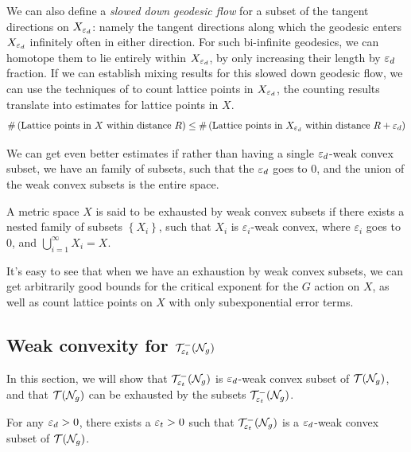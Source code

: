 \documentclass[12pt, reqno]{amsart}
\begin{document}
We can also define a \emph{slowed down geodesic flow} for a subset of the tangent directions on $X_{\varepsilon_d}$: namely the tangent directions along which the geodesic enters $X_{\varepsilon_d}$ infinitely often in either direction.
For such bi-infinite geodesics, we can homotope them to lie entirely within $X_{\varepsilon_d}$, by only increasing their length by $\varepsilon_d$ fraction.
If we can establish mixing results for this slowed down geodesic flow, we can use the techniques of \textcite{roblin2003ergodicite} to count lattice points in $X_{\varepsilon_d}$, the counting results translate into estimates for lattice points in $X$.
\begin{align*}
  \#\left( \text{Lattice points in $X$ within distance $R$} \right) \leq \#\left( \text{Lattice points in $X_{\varepsilon_d}$ within distance $R + \varepsilon_d$} \right)
\end{align*}

We can get even better estimates if rather than having a single $\varepsilon_d$-weak convex subset, we have an family of subsets, such that the $\varepsilon_d$ goes to $0$, and the union of the weak convex subsets is the entire space.

\begin{definition}
  A metric space $X$ is said to be exhausted by weak convex subsets if there exists a nested family of subsets $\left\{ X_i \right\}$, such that $X_i$ is $\varepsilon_i$-weak convex, where $\varepsilon_i$ goes to $0$, and $\bigcup_{i=1}^{\infty} X_i = X$.
\end{definition}

It's easy to see that when we have an exhaustion by weak convex subsets, we can get arbitrarily good bounds for the critical exponent for the $G$ action on $X$, as well as count lattice points on $X$ with only subexponential error terms.

\subsection{Weak convexity for $\mathcal{T}_{\varepsilon_t}^{-}(\mathcal{N}_g)$}
\label{sec:weak-conv-syst}

In this section, we will show that $\mathcal{T}_{\varepsilon_t}^{-}(\mathcal{N}_g)$ is $\varepsilon_d$-weak convex subset of $\mathcal{T}(\mathcal{N}_g)$, and that $\mathcal{T}(\mathcal{N}_g)$ can be exhausted by the subsets $\mathcal{T}_{\varepsilon_t}^{-}(\mathcal{N}_g)$.

\begin{theorem}
  \label{thm:weak-convexity}
  For any $\varepsilon_d > 0$, there exists a $\varepsilon_t > 0$ such that $\mathcal{T}_{\varepsilon_t}^{-}(\mathcal{N}_g)$ is a $\varepsilon_d$-weak convex subset of $\mathcal{T}(\mathcal{N}_g)$.
\end{theorem}
\end{document}
